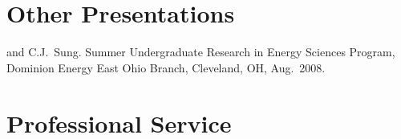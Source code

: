 \section{{\sectionfont Other Presentations}}

\begin{bibmune}
\item {} and C.J.\ Sung.  Summer Undergraduate Research in Energy Sciences Program,
        Dominion Energy East Ohio Branch, Cleveland, OH, Aug.\ 2008.\\
\end{bibmune}

\vspace{0.1in}

\section{{\sectionfont Professional Service}}

